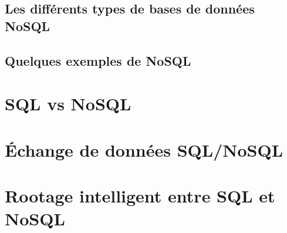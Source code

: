 \subsection{Les différents types de bases de données \textsf{NoSQL}} 

\subsection{Quelques exemples de \textsf{NoSQL}}

\section{SQL vs NoSQL}

\section{Échange de données SQL/NoSQL}

\section{Rootage intelligent entre SQL et NoSQL}

